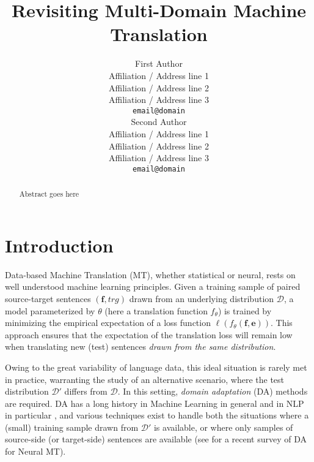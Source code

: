\documentclass[11pt]{article}
\title{Revisiting Multi-Domain Machine Translation}
\author{First Author \\
  Affiliation / Address line 1 \\
  Affiliation / Address line 2 \\
  Affiliation / Address line 3 \\
  {\tt email@domain} \\\And
  Second Author \\
  Affiliation / Address line 1 \\
  Affiliation / Address line 2 \\
  Affiliation / Address line 3 \\
  {\tt email@domain} \\}
\date{}
\newcommand{\src}{\ensuremath{\mathbf{f}}} %
\newcommand{\trg}{\ensuremath{\mathbf{e}}} %
\begin{document}
\maketitle
\begin{abstract}
Abstract goes here
\end{abstract}

\section{Introduction}
\label{intro}

%
% 

Data-based Machine Translation (MT), whether statistical or neural, rests on well understood machine learning principles. Given a training sample of paired source-target sentences $(\src,trg)$ drawn from an underlying distribution $\mathcal{D}$, a model parameterized by $\theta$ (here a translation function $f_{\theta}$) is trained by minimizing the empirical expectation of a loss function $\ell(f_\theta(\src, \trg))$. This approach ensures that the expectation of the translation loss will remain low when translating new (test) sentences \emph{drawn from the same distribution}.

Owing to the great variability of language data, this ideal situation is rarely met in practice, warranting the study of an alternative scenario, where the test distribution $\mathcal{D'}$ differs from $\mathcal{D}$. In this setting, \emph{domain adaptation} (DA) methods are required. DA has a long history in Machine Learning in general \cite{} and in NLP in particular \cite{Daume,Blitzer}, and various techniques exist to handle both the situations where a (small) training sample drawn from $\mathcal{D'}$ is available, or where only samples of source-side (or target-side) sentences are available (see \cite{Chu18asurvey} for a recent survey of DA for Neural MT).
\end{document}

